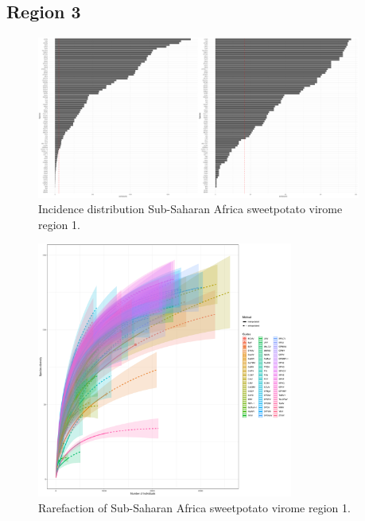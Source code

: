 \documentclass{article}
\begin{document}
\subsection{Region 3}

\begin{figure}[h!]
\begin{center}
\includegraphics[width=0.95\textwidth]{../results/k-cluster3/3-kcluster_incidence_w+bFeb28.pdf
} %
\caption{Incidence distribution Sub-Saharan Africa sweetpotato virome region 1.}
\end{center}
\end{figure}


\begin{figure}[h!]
\begin{center}
\includegraphics[width=0.75\textwidth]{../results/k-cluster3/3-kcluster_rarefaction-iNEXT_Feb28.pdf
} %
\caption{Rarefaction of Sub-Saharan Africa sweetpotato virome region 1.}
\end{center}
\end{figure}
\end{document}
